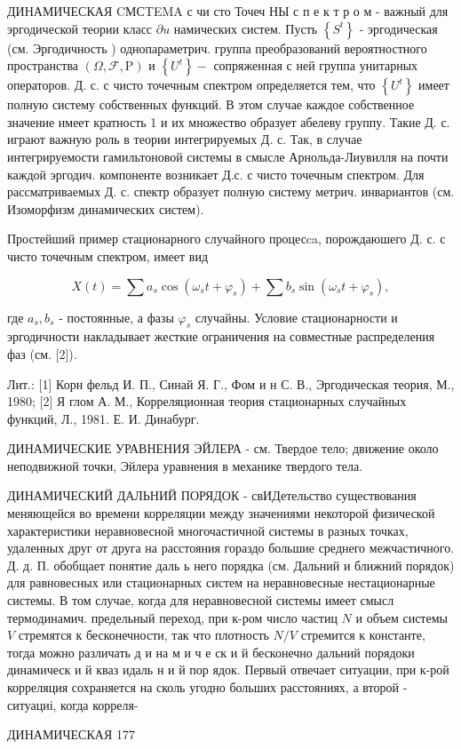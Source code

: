 \documentclass[10pt]{article}
\begin{document}
ДИНАМИЧЕСКАЯ CМСTEMA с чи сто Точеч НЫ с п е к т р о м - важный для эргодической теории класс $\partial u$ намических систем. Пусть $\left\{S^{t}\right\}$ - эргодическая (см. Эргодичность ) однопараметрич. группа преобразований вероятностного пространства $(\Omega, \mathscr{F}, \mathrm{P})$ и $\left\{U^{t}\right\}-$ сопряженная с ней группа унитарных операторов. Д. с. с чисто точечным спектром определяется тем, что $\left\{U^{t}\right\}$ имеет полную систему собственных функций. В этом случае каждое собственное значение имеет кратность 1 и их множество образует абелеву группу. Такие Д. с. играют важную роль в теории интегрируемых Д. с. Так, в случае интегрируемости гамильтоновой системы в смысле Арнольда-Лиувилля на почти каждой эргодич. компоненте возникает Д.с. с чисто точечным спектром. Для рассматриваемых Д. с. спектр образует полную систему метрич. инвариантов (см. Изоморфизм динамических систем).



Простейший пример стационарного случайного процесca, порождаюшего Д. с. с чисто точечным спектром, имеет вид



\[

X(t)=\sum a_{s} \cos \left(\omega_{s} t+\varphi_{s}\right)+\sum b_{s} \sin \left(\omega_{s} t+\varphi_{s}\right),

\]



где $a_{s}, b_{s}$ - постоянные, а фазы $\varphi_{s}$ случайны. Условие стационарности и эргодичности накладывает жесткие ограничения на совместные распределения фаз (см. [2]).



Лит.: [1] Корн фельд И. П., Синай Я. Г., Фом и н С. В., Эргодическая теория, М., 1980; [2] Я глом А. М., Корреляционная теория стационарных случайных функций, Л., 1981. Е. И. Динабург.



ДИНАМИЧЕСКИЕ УРАВНЕНИЯ ЭЙЛЕРА - см. Твердое тело; движение около неподвижной точки, Эйлера уравнения в механике твердого тела.



ДИНАМИЧЕСКИЙ ДАЛЬНИЙ ПОРЯДОК - свИДетельство существования меняющейся во времени корреляции между значениями некоторой физической характеристики неравновесной многочастичной системы в разных точках, удаленных друг от друга на расстояния гораздо большие среднего межчастичного. Д. д. П. обобщает понятие даль ь него порядка (см. Дальний и ближний порядок) для равновесных или стационарных систем на неравновесные нестационарные системы. В том случае, когда для неравновесной системы имеет смысл термодинамич. предельный переход, при к-ром число частиц $N$ и объем системы $V$ стремятся к бесконечности, так что плотность $N / V$ стремится к константе, тогда можно различать д и на м и ч е ск и й бесконечно дальний порядоки динамическ и й кваз идаль н и й пор ядок. Первый отвечает ситуации, при к-рой корреляция сохраняется на сколь угодно больших расстояниях, а второй - ситуациі, когда корреля-



ДИНАМИЧЕСКАЯ 177
\end{document}
